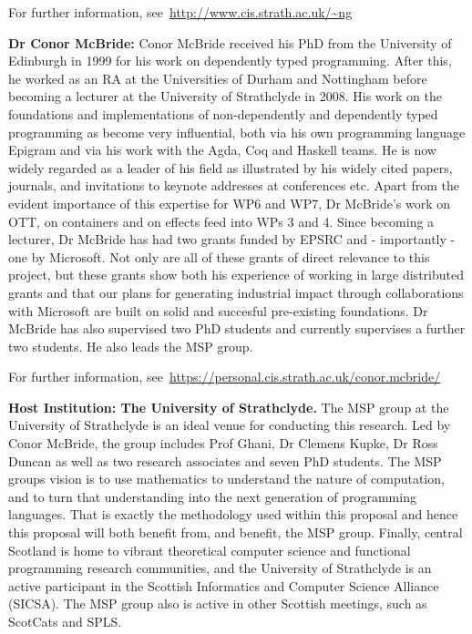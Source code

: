 \documentclass[a4paper,11pt]{article}
\begin{document}
For further information, see~\url{http://www.cis.strath.ac.uk/~ng}

\textbf{Dr Conor McBride:} Conor McBride received his PhD from the
University of Edinburgh in 1999 for his work on dependently typed
programming. After this, he worked as an RA at the Universities of
Durham and Nottingham before becoming a lecturer at the University of
Strathclyde in 2008. His work on the foundations and implementations
of non-dependently and dependently typed programming as become very
influential, both via his own programming language Epigram and via his
work with the Agda, Coq and Haskell teams. He is now widely regarded
as a leader of his field as illustrated by his widely cited papers,
journals, and invitations to keynote addresses at conferences
etc. Apart from the evident importance of this expertise for WP6 and
WP7, Dr McBride's work on OTT, on containers and on effects feed into
WPs 3 and 4. Since becoming a lecturer, Dr McBride has had two grants
funded by EPSRC and - importantly - one by Microsoft. Not only are all
of these grants of direct relevance to this project, but these grants
show both his experience of working in large distributed grants and
that our plans for generating industrial impact through collaborations
with Microsoft are built on solid and succesful pre-existing
foundations. Dr McBride has also supervised two PhD students and
currently supervises a further two students. He also leads the MSP
group.

For further information,
see~\url{https://personal.cis.strath.ac.uk/conor.mcbride/}

\textbf{Host Institution: The University of Strathclyde.} The MSP
group at the University of Strathclyde is an ideal venue for
conducting this research. Led by Conor McBride, the group includes
Prof Ghani, Dr Clemens Kupke, Dr Ross Duncan as well as two research
associates and seven PhD students. The MSP groups vision is to use
mathematics to understand the nature of computation, and to turn that
understanding into the next generation of programming languages. That
is exactly the methodology used within this proposal and hence this
proposal will both benefit from, and benefit, the MSP group.
Finally, central Scotland is home to vibrant theoretical computer
science and functional programming research communities, and the
University of Strathclyde is an active participant in the Scottish
Informatics and Computer Science Alliance (SICSA). The MSP group also
is active in other Scottish meetings, such as ScotCats and SPLS.
\end{document}
